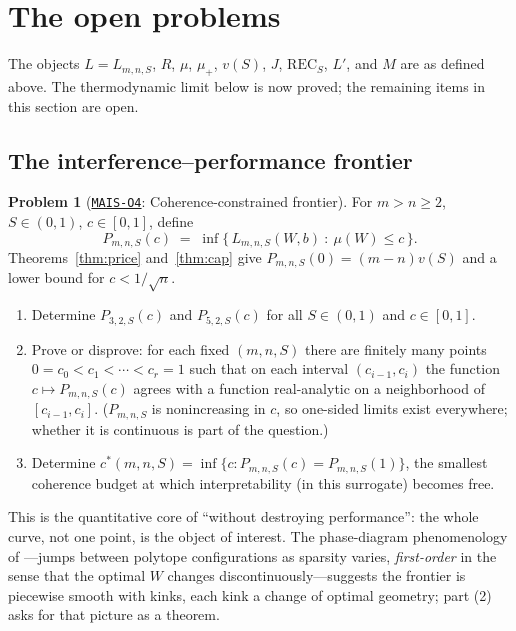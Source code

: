 \documentclass[11pt]{amsart}
\newcommand{\Oid}[1]{\href{https://github.com/lionellevine/MAIS/blob/main/open-problems/MAIS-O#1.md}{\texttt{MAIS-O#1}}}
\theoremstyle{plain}
\theoremstyle{definition}
\newtheorem{problem}[theorem]{Problem}
\begin{document}
\section{The open problems}\label{sec:problems}

The objects $L=L_{m,n,S}$, $R$, $\mu$, $\mu_+$, $v(S)$, $J$, $\mathrm{REC}_S$, $L'$, and $M$ are as defined above. The thermodynamic limit below is now proved; the remaining items in this section are open.

\subsection{The interference--performance frontier}

\begin{problem}[\Oid{4}: Coherence-constrained frontier]\label{prob:frontier}
For $m>n\ge2$, $S\in(0,1)$, $c\in[0,1]$, define
\[
P_{m,n,S}(c) \;=\; \inf\bigl\{\,L_{m,n,S}(W,b)\ :\ \mu(W)\le c\,\bigr\}.
\]
Theorems~\ref{thm:price} and~\ref{thm:cap} give $P_{m,n,S}(0)=(m-n)v(S)$ and a lower bound for $c<1/\sqrt n$.
\begin{enumerate}
\item Determine $P_{3,2,S}(c)$ and $P_{5,2,S}(c)$ for all $S\in(0,1)$ and $c\in[0,1]$.
\item Prove or disprove: for each fixed $(m,n,S)$ there are finitely many points $0=c_0<c_1<\cdots<c_r=1$ such that on each interval $(c_{i-1},c_i)$ the function $c\mapsto P_{m,n,S}(c)$ agrees with a function real-analytic on a neighborhood of $[c_{i-1},c_i]$. ($P_{m,n,S}$ is nonincreasing in $c$, so one-sided limits exist everywhere; whether it is continuous is part of the question.)
\item Determine $c^*(m,n,S)=\inf\{c: P_{m,n,S}(c)=P_{m,n,S}(1)\}$, the smallest coherence budget at which interpretability (in this surrogate) becomes free.
\end{enumerate}
\end{problem}

This is the quantitative core of ``without destroying performance'': the whole curve, not one point, is the object of interest. The phase-diagram phenomenology of \cite{elhage2022}---jumps between polytope configurations as sparsity varies, \emph{first-order} in the sense that the optimal $W$ changes discontinuously---suggests the frontier is piecewise smooth with kinks, each kink a change of optimal geometry; part (2) asks for that picture as a theorem.
\end{document}
